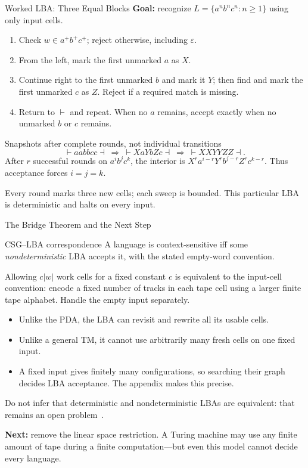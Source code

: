 \documentclass[10pt]{beamer}
\begin{document}
\begin{frame}{Worked LBA: Three Equal Blocks}
  \small
  \textbf{Goal:} recognize $L=\{a^n b^n c^n:n\ge1\}$ using only input cells.
  \begin{enumerate}
    \item Check $w\in a^+b^+c^+$; reject otherwise, including $\varepsilon$.
    \item From the left, mark the first unmarked $a$ as $X$.
    \item Continue right to the first unmarked $b$ and mark it $Y$;
      then find and mark the first unmarked $c$ as $Z$.
      Reject if a required match is missing.
    \item Return to $\vdash$ and repeat. When no $a$ remains, accept
      exactly when no unmarked $b$ or $c$ remains.
  \end{enumerate}
  \begin{block}{Snapshots after complete rounds, not individual transitions}
    \[
      \vdash aabbcc\dashv
      \ \Longrightarrow\ \vdash XaYbZc\dashv
      \ \Longrightarrow\ \vdash XXYYZZ\dashv.
    \]
    After $r$ successful rounds on $a^ib^jc^k$, the interior is
    $X^ra^{i-r}Y^rb^{j-r}Z^rc^{k-r}$. Thus acceptance forces $i=j=k$.
  \end{block}
  Every round marks three new cells; each sweep is bounded. This particular
  LBA is deterministic and halts on every input.
\end{frame}


\begin{frame}{The Bridge Theorem and the Next Step}
  \small
  \begin{block}{CSG--LBA correspondence \cite{gallier-csg}}
    A language is context-sensitive iff some \emph{nondeterministic} LBA
    accepts it, with the stated empty-word convention.
  \end{block}
  Allowing $c|w|$ work cells for a fixed constant $c$ is equivalent to the
  input-cell convention: encode a fixed number of tracks in each tape cell
  using a larger finite tape alphabet. Handle the empty input separately.
  \begin{itemize}
    \item Unlike the PDA, the LBA can revisit and rewrite all its usable cells.
    \item Unlike a general TM, it cannot use arbitrarily many fresh cells
      on one fixed input.
    \item A fixed input gives finitely many configurations, so searching
      their graph decides LBA acceptance. The appendix makes this precise.
  \end{itemize}
  Do not infer that deterministic and nondeterministic LBAs are equivalent:
  that remains an open problem~\cite{lba-notes}.
  \par\smallskip
  \textbf{Next:} remove the linear space restriction. A Turing machine may
  use any finite amount of tape during a finite computation---but even this
  model cannot decide every language.
\end{frame}
\end{document}
